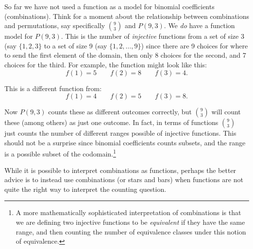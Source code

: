 \documentclass[10pt,]{book}
\theoremstyle{plain}
\theoremstyle{definition}
\theoremstyle{definition}
\theoremstyle{definition}
\numberwithin{equation}{chapter}
\begin{document}
    So far we have not used a function as a model for binomial coefficients (combinations). Think for a moment about the relationship between combinations and permutations, say specifically \({9 \choose 3}\) and \(P(9,3)\). We \emph{do} have a function model for \(P(9,3)\). This is the number of \emph{injective} functions from a set of size 3 (say \(\{1,2,3\}\) to a set of size 9 (say \(\{1,2,\ldots, 9\}\)) since there are 9 choices for where to send the first element of the domain, then only 8 choices for the second, and 7 choices for the third. For example, the function might look like this:
    \begin{equation*}
      f(1) = 5 \qquad f(2) = 8 \qquad f(3) = 4.
    \end{equation*}
\par

    This is a different function from:
    \begin{equation*}
      f(1) = 4 \qquad f(2) = 5 \qquad f(3) = 8.
    \end{equation*}
\par

    Now \(P(9,3)\) counts these as different outcomes correctly, but \({9\choose 3}\) will count these (among others) as just one outcome. In fact, in terms of functions \({9 \choose 3}\) just counts the number of different ranges possible of injective functions. This should not be a surprise since binomial coefficients counts subsets, and the range is a possible subset of the codomain.\footnote{A more mathematically sophisticated interpretation of combinations is that we are defining two injective functions to be \emph{equivalent} if they have the same range, and then counting the number of equivalence classes under this notion of equivalence.\label{fn-4}}
\par

    While it is possible to interpret combinations as functions, perhaps the better advice is to instead use combinations (or stars and bars) when functions are not quite the right way to interpret the counting question.
\typeout{************************************************}
\typeout{************************************************}
\end{document}
